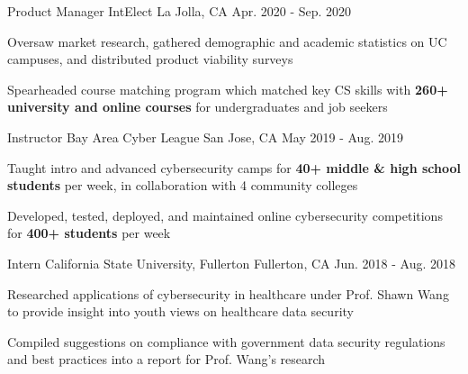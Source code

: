 

\begin{cventries}

  \cventry
    {Product Manager} %
    {IntElect} %
    {La Jolla, CA} %
    {Apr. 2020 - Sep. 2020} %
    {
      \begin{cvitems} %
        \item {Oversaw market research, gathered demographic and academic statistics on UC campuses, and distributed product viability surveys}
        \item {Spearheaded course matching program which matched key CS skills with \textbf{260+ university and online courses} for undergraduates and job seekers}
      \end{cvitems}
    }

  \cventry
    {Instructor} %
    {Bay Area Cyber League} %
    {San Jose, CA} %
    {May 2019 - Aug. 2019} %
    {
      \begin{cvitems} %
        \item {Taught intro and advanced cybersecurity camps for \textbf{40+ middle \& high school students} per week, in collaboration with 4 community colleges}
        \item {Developed, tested, deployed, and maintained online cybersecurity competitions for \textbf{400+ students} per week}
      \end{cvitems}
    }

  \cventry
    {Intern} %
    {California State University, Fullerton} %
    {Fullerton, CA} %
    {Jun. 2018 - Aug. 2018} %
    {
      \begin{cvitems} %
        \item {Researched applications of cybersecurity in healthcare under Prof. Shawn Wang to provide insight into youth views on healthcare data security}
        \item {Compiled suggestions on compliance with government data security regulations and best practices into a report for Prof. Wang's research}
      \end{cvitems}
    }

\end{cventries}
